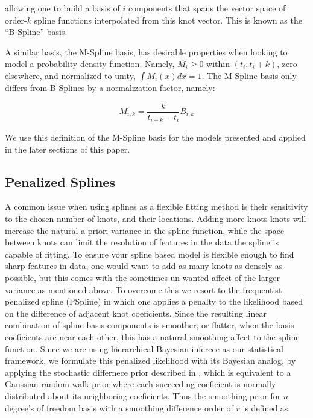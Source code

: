 \noindent allowing one to build a basis of $i$ components that spans the vector space of order-$k$ spline functions interpolated 
from this knot vector. This is known as the ``B-Spline'' basis. 

A similar basis, the M-Spline basis, has desirable properties when looking to model a probability density function. Namely, 
$M_i \geq 0$ within $(t_i, t_i+k)$, zero elsewhere, and normalized to unity, $\int M_i(x)dx = 1$. The M-Spline basis only differs 
from B-Splines by a normalization factor, namely:

\begin{equation}\label{eq:MB_SplineRelation}
M_{i,k} = \frac{k}{t_{i+k} - t_i} B_{i,k}
\end{equation}

\noindent We use this definition of the M-Spline basis for the models presented and applied in the later sections of this paper. 

\subsection{Penalized Splines}
A common issue when using splines as a flexible fitting method is their sensitivity to the chosen number of knots, and their locations. 
Adding more knots knots will increase the natural a-priori variance in the spline function, while the space between knots can limit the 
resolution of features in the data the spline is capable of fitting. To ensure your spline based model is flexible enough to find sharp
features in data, one would want to add as many knots as densely as possible, but this comes with the sometimes un-wanted affect of the 
larger variance as mentioned above. To overcome this we resort to the frequentist penalized spline (PSpline) in which one applies a penalty
to the likelihood based on the difference of adjacent knot coeficients. Since the resulting linear combination of spline basis components is 
smoother, or flatter, when the basis coeficients are near each other, this has a natural smoothing affect to the spline function. Since we are 
using hierarchical Bayesian inferece as our statistical framework, we formulate this penalized likelihood with its Bayesian analog, by applying 
the stochastic differnece prior described in , which is equivalent to a Gaussian random walk prior where each succeeding 
coeficient is normally distributed about its neighboring coeficients. Thus the smoothing prior for $n$ degree's of freedom basis with a smoothing 
difference order of $r$ is defined as:

